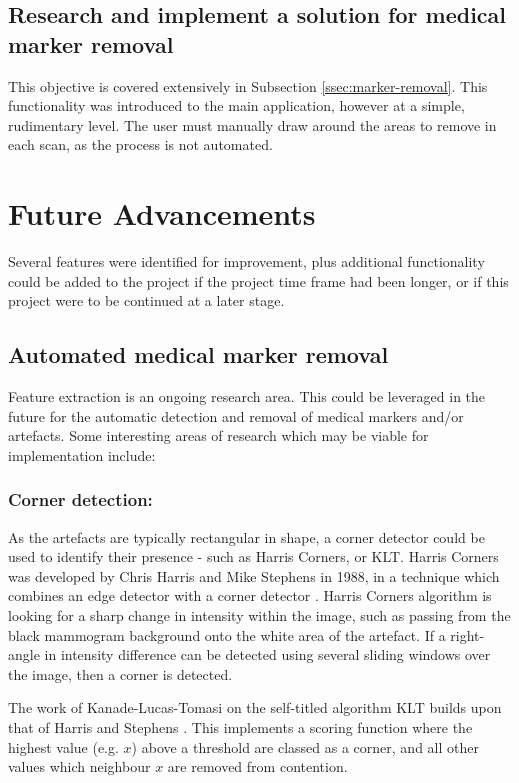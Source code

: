 \subsection{Research and implement a solution for medical marker removal}

This objective is covered extensively in Subsection \ref{ssec:marker-removal}. This functionality was introduced to the main application, however at a simple, rudimentary level. The user must manually draw around the areas to remove in each scan, as the process is not automated.


\section{Future Advancements}
\label{ssec:improvements}

Several features were identified for improvement, plus additional functionality could be added to the project if the project time frame had been longer, or if this project were to be continued at a later stage.

\subsection{Automated medical marker removal}
Feature extraction is an ongoing research area. This could be leveraged in the future for the automatic detection and removal of medical markers and/or artefacts. Some interesting areas of research which may be viable for implementation include:

\subsubsection{Corner detection: } As the artefacts are typically rectangular in shape, a corner detector could be used to identify their presence - such as Harris Corners, or KLT. Harris Corners was developed by Chris Harris and Mike Stephens in 1988, in a technique which combines an edge detector with a corner detector \cite{Harris_Stephens_1988}. Harris Corners algorithm is looking for a sharp change in intensity within the image, such as passing from the black mammogram background onto the white area of the artefact. If a right-angle in intensity difference can be detected using several sliding windows over the image, then a corner is detected.

The work of Kanade-Lucas-Tomasi on the self-titled algorithm \acrshort{KLT} builds upon that of Harris and Stephens \cite{Shi_Tomasi_1994} \cite{tomasi2004detection}. This implements a scoring function where the highest value (e.g. $x$) above a threshold are classed as a corner, and all other values which neighbour $x$ are removed from contention.

